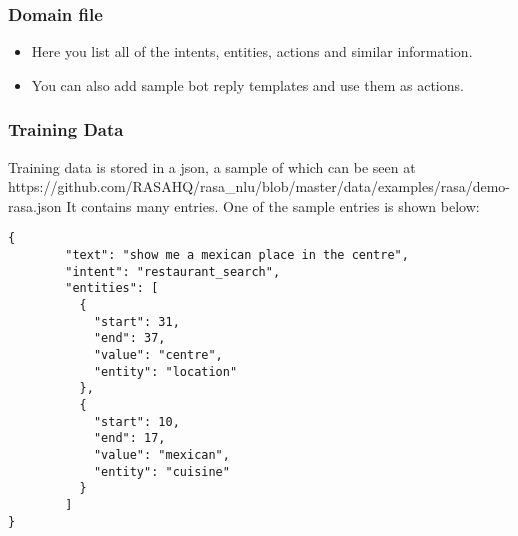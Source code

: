  \begin{frame}[fragile]\frametitle{Domain file}
 
\begin{itemize}
\item Here you list all of the intents, entities, actions and similar information. 
\item You can also add sample bot reply templates and use them as actions.
\end{itemize}

\end{frame}








 \begin{frame}[fragile]\frametitle{Training Data}
Training data is stored in a json, a sample of which can be seen at https://github.com/RASAHQ/rasa\_nlu/blob/master/data/examples/rasa/demo-rasa.json
It contains many entries. One of the sample entries is shown below:
\begin{lstlisting}
{
        "text": "show me a mexican place in the centre",
        "intent": "restaurant_search",
        "entities": [
          {
            "start": 31,
            "end": 37,
            "value": "centre",
            "entity": "location"
          },
          {
            "start": 10,
            "end": 17,
            "value": "mexican",
            "entity": "cuisine"
          }
        ]
}
\end{lstlisting}

\end{frame}

